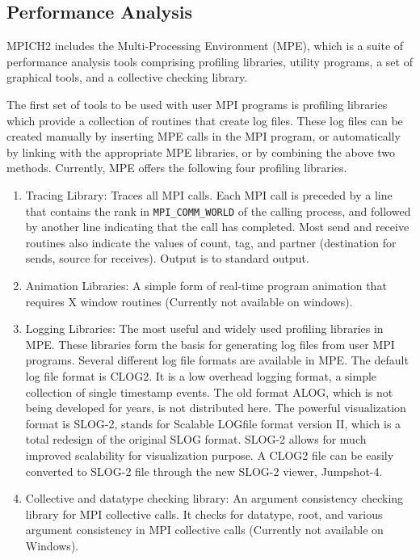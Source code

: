 \documentclass[dvipdfm,11pt]{article}
\begin{document}
\subsection{Performance Analysis}
MPICH2 includes the Multi-Processing Environment (MPE), which is a
suite of performance analysis tools comprising profiling libraries,
utility programs, a set of graphical tools, and a collective checking library. 

The first set of tools to be used with user MPI programs is profiling libraries
which provide a collection of routines that create log files.  These log files
can be created manually by inserting MPE calls in the MPI program, or
automatically by linking with the appropriate MPE libraries, or by combining
the above two methods.  Currently, MPE offers the following four profiling
libraries.

\begin{enumerate}
   \item Tracing Library: Traces all MPI calls.  Each MPI call is preceded by a
      line that contains the rank in \texttt{MPI\_COMM\_WORLD} of the calling process,
      and followed by another line indicating that the call has completed.
      Most send and receive routines also indicate the values of count, tag,
      and partner (destination for sends, source for receives).  Output is to
      standard output.

   \item Animation Libraries: A simple form of real-time program animation
      that requires X window routines (Currently not available on windows).

   \item Logging Libraries: The most useful and widely used profiling libraries
      in MPE.  These libraries form the basis for generating log files from
      user MPI programs.  Several different log file formats are
      available in MPE.  The default log file format is CLOG2.  It is a low
      overhead logging format, a simple collection of single timestamp events.
      The old format ALOG, which is not being developed for years, is not
      distributed here.  The powerful visualization format is SLOG-2, stands
      for Scalable LOGfile format version II, which is a total redesign of the
      original SLOG format.  SLOG-2 allows for much improved scalability for
      visualization purpose. A CLOG2 file can be easily converted to
      SLOG-2 file through the new SLOG-2 viewer, Jumpshot-4.

   \item Collective and datatype checking library: An argument consistency
      checking library for MPI collective calls.  It checks for datatype, root,
      and various argument consistency in MPI collective calls (Currently not
      available on Windows).
\end{enumerate}
\end{document}
